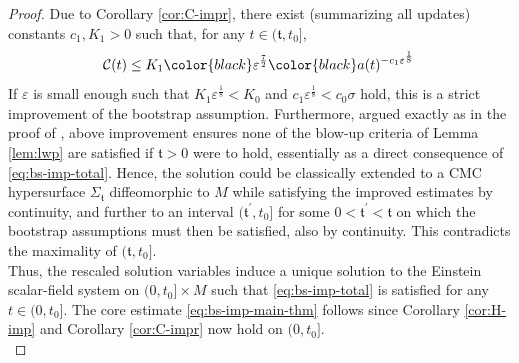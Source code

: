 \documentclass[11pt,leqno,textwidth=10cm]{amsart}
\numberwithin{equation}{section}
\theoremstyle{definition}
\theoremstyle{plain}
\newcommand{\1}{\mathbbm{1}}
\newcommand{\E}{\mathcal{E}}
\newcommand{\Ric}{\text{\normalfont{Ric}}}
\renewcommand{\epsilon}{\varepsilon}
\newcommand{\change}[1]{\color{black}#1\color{black}}
\newcommand{\delete}[1]{}
\begin{document}
\begin{proof}
Due to Corollary \ref{cor:C-impr}, there exist (summarizing all updates) constants $c_1,K_1>0$ such that, for any $t\in(\mathfrak{t},t_0]$,
\begin{equation}\label{eq:bs-imp-total}
\mathcal{C}(t)\leq K_1\change{\epsilon^\frac72}a(t)^{-c_1\epsilon^\frac18}\,
\end{equation}
If $\epsilon$ is small enough such that $K_1\epsilon^\frac18<K_0$ and $c_1\epsilon^\frac1{8}<c_0\sigma$ hold, this is a strict improvement of the bootstrap assumption. Furthermore, argued exactly as in the proof of \cite[Theorem 15.1]{Rodnianski2014}, above improvement ensures none of the blow-up criteria of Lemma \ref{lem:lwp} are satisfied if $\mathfrak{t}>0$ were to hold, essentially as a direct consequence of \eqref{eq:bs-imp-total}. Hence, the solution could be classically extended to a CMC hypersurface $\Sigma_{\mathfrak{t}}$ diffeomorphic to $M$ while satisfying the improved estimates by continuity, and further to an interval $(\mathfrak{t}^\prime,t_0]$ for some $0<\mathfrak{t}^\prime<\mathfrak{t}$ on which the bootstrap assumptions must then be satisfied, also by continuity. This contradicts the maximality of $(\mathfrak{t},t_0]$.\\

Thus, the rescaled solution variables induce a unique solution to the Einstein scalar-field system on $(0,t_0]\times M$ such that \eqref{eq:bs-imp-total} \change{is }satisfied for any $t\in(0,t_0]$. The core estimate \eqref{eq:bs-imp-main-thm} follows since Corollary \ref{cor:H-imp} and Corollary \ref{cor:C-impr} now hold on $(0,t_0]$.\\


\end{proof}
\end{document}
